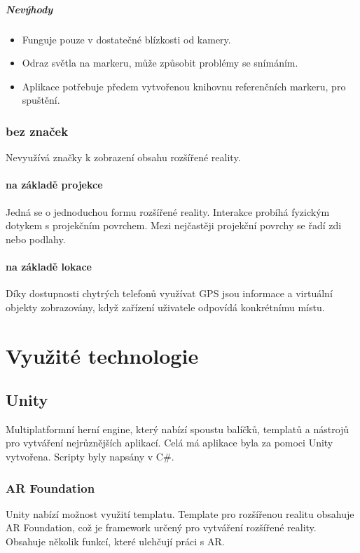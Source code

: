\documentclass[12pt, a4paper,
twoside,        %
openright
]{report}
\begin{document}
\paragraph{Nevýhody}
\begin{itemize}
	\item Funguje pouze v dostatečné blízkosti od kamery.
	\item Odraz světla na markeru, může způsobit problémy se snímáním.
	\item Aplikace potřebuje předem vytvořenou knihovnu referenčních markeru, pro spuštění.
\end{itemize}

\subsection{bez značek}
Nevyužívá značky k zobrazení obsahu rozšířené reality.

\subsubsection{na základě projekce}
Jedná se o jednoduchou formu rozšířené reality. Interakce probíhá fyzickým dotykem s projekčním povrchem. Mezi nejčastěji projekční povrchy se řadí zdi nebo podlahy.

\subsubsection{na základě lokace}
Díky dostupnosti chytrých telefonů využívat GPS jsou informace a virtuální objekty zobrazovány, když zařízení uživatele odpovídá konkrétnímu místu. 

	

\chapter{Využité technologie}
	
\section{Unity}
\label{sec:unity}
Multiplatformní herní engine, který nabízí spoustu balíčků, templatů a nástrojů pro vytváření nejrůznějších aplikací. Celá má aplikace byla za pomoci Unity vytvořena. Scripty byly napsány v C\#.

\subsection{AR Foundation}
Unity nabízí možnost využití templatu. Template pro rozšířenou realitu obsahuje AR Foundation, což je framework určený pro vytváření rozšířené reality. Obsahuje několik funkcí, které ulehčují práci s AR. 
\end{document}
